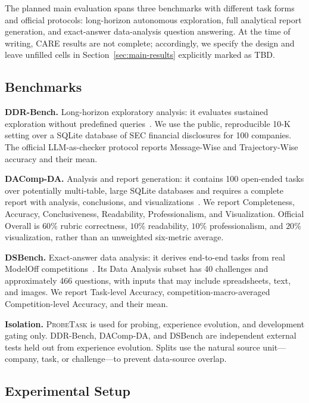 \documentclass{article}
\newcommand{\method}{\textsc{CARE}}
\newcommand{\probe}{\textsc{ProbeTask}}
\begin{document}
The planned main evaluation spans three benchmarks with different task forms and official protocols:
long-horizon autonomous exploration, full analytical report generation, and exact-answer data-analysis question answering.
At the time of writing, \method{} results are not complete; accordingly, we specify the design and leave unfilled cells in Section~\ref{sec:main-results} explicitly marked as TBD.

\subsection{Benchmarks}
\label{sec:benchmarks}

\noindent\textbf{DDR-Bench.} Long-horizon exploratory analysis: it evaluates sustained exploration without predefined queries~\citep{liu2026ddrbench}.
We use the public, reproducible 10-K setting over a SQLite database of SEC financial disclosures for 100 companies.
The official LLM-as-checker protocol reports Message-Wise and Trajectory-Wise accuracy and their mean.

\noindent\textbf{DAComp-DA.} Analysis and report generation: it contains 100 open-ended tasks over potentially multi-table, large SQLite databases and requires a complete report with analysis, conclusions, and visualizations~\citep{lei2025dacomp}.
We report Completeness, Accuracy, Conclusiveness, Readability, Professionalism, and Visualization.
Official Overall is $60\%$ rubric correctness, $10\%$ readability, $10\%$ professionalism, and $20\%$ visualization, rather than an unweighted six-metric average.

\noindent\textbf{DSBench.} Exact-answer data analysis: it derives end-to-end tasks from real ModelOff competitions~\citep{jing2024dsbench}.
Its Data Analysis subset has 40 challenges and approximately 466 questions, with inputs that may include spreadsheets, text, and images.
We report Task-level Accuracy, competition-macro-averaged Competition-level Accuracy, and their mean.

\noindent\textbf{Isolation.} \probe{} is used for probing, experience evolution, and development gating only.
DDR-Bench, DAComp-DA, and DSBench are independent external tests held out from experience evolution.
Splits use the natural source unit---company, task, or challenge---to prevent data-source overlap.

\subsection{Experimental Setup}
\label{sec:main-exp-setup}
\end{document}
